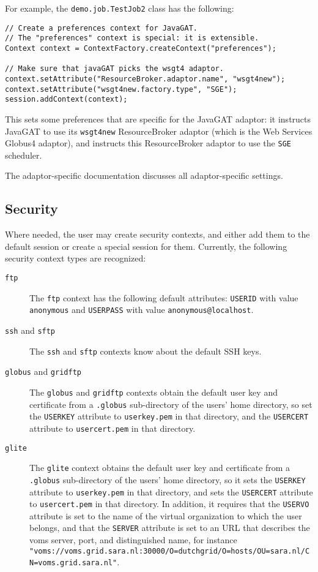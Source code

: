 \documentclass[a4paper,10pt]{article}
\begin{document}
For example, the \texttt{demo.job.TestJob2} class has the following:
{\small
\begin{verbatim}
// Create a preferences context for JavaGAT.
// The "preferences" context is special: it is extensible.
Context context = ContextFactory.createContext("preferences");

// Make sure that javaGAT picks the wsgt4 adaptor.
context.setAttribute("ResourceBroker.adaptor.name", "wsgt4new");
context.setAttribute("wsgt4new.factory.type", "SGE");
session.addContext(context);
\end{verbatim}
}
\noindent
This sets some preferences that are specific for the JavaGAT adaptor:
it instructs JavaGAT to use its \texttt{wsgt4new} ResourceBroker adaptor
(which is the Web Services Globus4 adaptor), and instructs this
ResourceBroker adaptor to use the \texttt{SGE} scheduler.

The adaptor-specific documentation discusses all adaptor-specific
settings.

\subsection{Security}

Where needed, the user may create security contexts, and either add them
to the default session or create a special session for them.
Currently, the following security context types are recognized:

\begin{description}

\item[\texttt{ftp}]
The \texttt{ftp} context has the following default attributes:
\texttt{USERID} with value \texttt{anonymous} and \texttt{USERPASS} with
value \texttt{anonymous@localhost}.

\item[\texttt{ssh} and \texttt{sftp}]
The \texttt{ssh} and \texttt{sftp} contexts know about the default SSH keys.

\item[\texttt{globus} and \texttt{gridftp}]
The \texttt{globus} and \texttt{gridftp} contexts obtain the default user key
and certificate from a \texttt{.globus} sub-directory of the users' home
directory, so set the \texttt{USERKEY} attribute to \texttt{userkey.pem}
in that directory, and the \texttt{USERCERT} attribute to
\texttt{usercert.pem} in that directory.

\item[\texttt{glite}]
The \texttt{glite} context obtains the default user key
and certificate from a \texttt{.globus} sub-directory of the users' home
directory, so it sets the \texttt{USERKEY} attribute to \texttt{userkey.pem}
in that directory, and sets the \texttt{USERCERT} attribute to
\texttt{usercert.pem} in that directory. In addition, it requires
that the \texttt{USERVO} attribute is set to the name of the virtual
organization to which the user belongs, and that the \texttt{SERVER}
attribute is set to an URL that describes the voms server, port,
and distinguished name, for instance \texttt{"voms://voms.grid.sara.nl:30000/O=dutchgrid/O=hosts/OU=sara.nl/CN=voms.grid.sara.nl"}.

\end{description}
\end{document}
